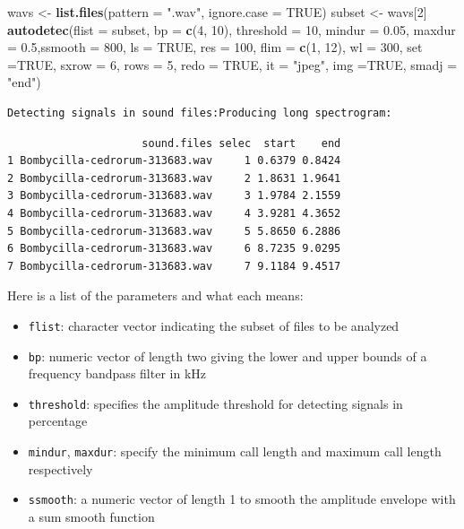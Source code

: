 \documentclass[
]{krantz}
\makeatletter
\newenvironment{Shaded}{\begin{snugshade}}{\end{snugshade}}
\newcommand{\DataTypeTok}[1]{\textcolor[rgb]{0.27,0.27,0.27}{#1}}
\newcommand{\DecValTok}[1]{\textcolor[rgb]{0.06,0.06,0.06}{#1}}
\newcommand{\FloatTok}[1]{\textcolor[rgb]{0.06,0.06,0.06}{#1}}
\newcommand{\KeywordTok}[1]{\textcolor[rgb]{0.27,0.27,0.27}{\textbf{#1}}}
\newcommand{\NormalTok}[1]{#1}
\newcommand{\OtherTok}[1]{\textcolor[rgb]{0.37,0.37,0.37}{#1}}
\newcommand{\StringTok}[1]{\textcolor[rgb]{0.5,0.5,0.5}{#1}}
\providecommand{\tightlist}{%
  \setlength{\itemsep}{0pt}\setlength{\parskip}{0pt}}
\newenvironment{kframe}{%
\medskip{}
\setlength{\fboxsep}{.8em}
 \def\at@end@of@kframe{}%
 \ifinner\ifhmode%
  \def\at@end@of@kframe{\end{minipage}}%
  \begin{minipage}{\columnwidth}%
 \fi\fi%
 \def\FrameCommand##1{\hskip\@totalleftmargin \hskip-\fboxsep
 \colorbox{shadecolor}{##1}\hskip-\fboxsep
     \hskip-\linewidth \hskip-\@totalleftmargin \hskip\columnwidth}%
 \MakeFramed {\advance\hsize-\width
   \@totalleftmargin\z@ \linewidth\hsize
   \@setminipage}}%
 {\par\unskip\endMakeFramed%
 \at@end@of@kframe}
\renewenvironment{Shaded}{\begin{kframe}}{\end{kframe}}
\makeatother
\begin{document}
\begin{Shaded}
\begin{Highlighting}[]
\NormalTok{wavs \textless{}{-}}\StringTok{ }\KeywordTok{list.files}\NormalTok{(}\DataTypeTok{pattern =} \StringTok{".wav"}\NormalTok{, }\DataTypeTok{ignore.case =} \OtherTok{TRUE}\NormalTok{)}
\NormalTok{subset \textless{}{-}}\StringTok{ }\NormalTok{wavs[}\DecValTok{2}\NormalTok{]}
\KeywordTok{autodetec}\NormalTok{(}\DataTypeTok{flist =}\NormalTok{ subset, }\DataTypeTok{bp =} \KeywordTok{c}\NormalTok{(}\DecValTok{4}\NormalTok{, }\DecValTok{10}\NormalTok{), }\DataTypeTok{threshold =} \DecValTok{10}\NormalTok{, }\DataTypeTok{mindur =} \FloatTok{0.05}\NormalTok{,}
           \DataTypeTok{maxdur =} \FloatTok{0.5}\NormalTok{,}\DataTypeTok{ssmooth =} \DecValTok{800}\NormalTok{, }\DataTypeTok{ls =} \OtherTok{TRUE}\NormalTok{,}
           \DataTypeTok{res =} \DecValTok{100}\NormalTok{, }\DataTypeTok{flim =} \KeywordTok{c}\NormalTok{(}\DecValTok{1}\NormalTok{, }\DecValTok{12}\NormalTok{), }\DataTypeTok{wl =} \DecValTok{300}\NormalTok{, }\DataTypeTok{set =}\OtherTok{TRUE}\NormalTok{, }\DataTypeTok{sxrow =} \DecValTok{6}\NormalTok{,}
           \DataTypeTok{rows =} \DecValTok{5}\NormalTok{, }\DataTypeTok{redo =} \OtherTok{TRUE}\NormalTok{, }\DataTypeTok{it =} \StringTok{"jpeg"}\NormalTok{, }\DataTypeTok{img =}\OtherTok{TRUE}\NormalTok{, }\DataTypeTok{smadj =} \StringTok{"end"}\NormalTok{)}
\end{Highlighting}
\end{Shaded}

\begin{verbatim}
Detecting signals in sound files:Producing long spectrogram:
\end{verbatim}

\begin{verbatim}
                     sound.files selec  start    end
1 Bombycilla-cedrorum-313683.wav     1 0.6379 0.8424
2 Bombycilla-cedrorum-313683.wav     2 1.8631 1.9641
3 Bombycilla-cedrorum-313683.wav     3 1.9784 2.1559
4 Bombycilla-cedrorum-313683.wav     4 3.9281 4.3652
5 Bombycilla-cedrorum-313683.wav     5 5.8650 6.2886
6 Bombycilla-cedrorum-313683.wav     6 8.7235 9.0295
7 Bombycilla-cedrorum-313683.wav     7 9.1184 9.4517
\end{verbatim}

Here is a list of the parameters and what each means:

\begin{itemize}
\tightlist
\item
  \texttt{flist}: character vector indicating the subset of files to be analyzed
\item
  \texttt{bp}: numeric vector of length two giving the lower and upper bounds of a frequency bandpass filter in kHz
\item
  \texttt{threshold}: specifies the amplitude threshold for detecting signals in percentage
\item
  \texttt{mindur}, \texttt{maxdur}: specify the minimum call length and maximum call length respectively
\item
  \texttt{ssmooth}: a numeric vector of length 1 to smooth the amplitude envelope with a sum smooth function
\end{itemize}
\end{document}
